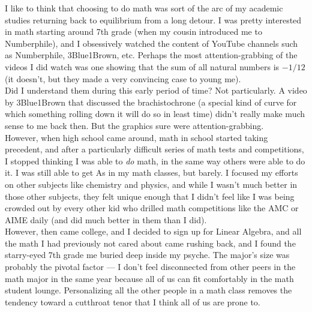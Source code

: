 \documentclass[8pt]{extarticle}
\title{}
\author{Avinash Iyer}
\date{}
\begin{document}
I like to think that choosing to do math was sort of the arc of my academic studies returning back to equilibrium from a long detour. I was pretty interested in math starting around 7th grade (when my cousin introduced me to Numberphile), and I obsessively watched the content of YouTube channels such as Numberphile, 3Blue1Brown, etc. Perhaps the most attention-grabbing of the videos I did watch was one showing that the sum of all natural numbers is $-1/12$ (it doesn't, but they made a very convincing case to young me).\\

Did I understand them during this early period of time? Not particularly. A video by 3Blue1Brown that discussed the brachistochrone (a special kind of curve for which something rolling down it will do so in least time) didn't really make much sense to me back then. But the graphics sure were attention-grabbing.\\

  However, when high school came around, math in school started taking precedent, and after a particularly difficult series of math tests and competitions, I stopped thinking I was able to \textit{do} math, in the same way others were able to do it. I was still able to get As in my math classes, but barely. I focused my efforts on other subjects like chemistry and physics, and while I wasn't much better in those other subjects, they felt unique enough that I didn't feel like I was being crowded out by every other kid who drilled math competitions like the AMC or AIME daily (and did much better in them than I did).\\

  However, then came college, and I decided to sign up for Linear Algebra, and all the math I had previously not cared about came rushing back, and I found the starry-eyed 7th grade me buried deep inside my psyche. The major's size was probably the pivotal factor --- I don't feel disconnected from other peers in the math major in the same year because all of us can fit comfortably in the math student lounge. Personalizing all the other people in a math class removes the tendency toward a cutthroat tenor that I think all of us are prone to.\\
\end{document}
